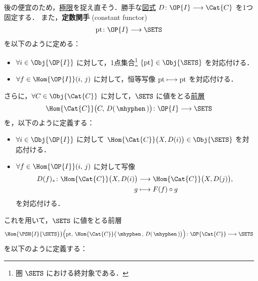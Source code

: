\documentclass[TQFT_main]{subfiles}
\begin{document}
後の便宜のため，\hyperref[def:lim]{極限}を捉え直そう．勝手な\hyperref[def:diagram]{図式} $D \colon \OP{I} \lto \Cat{C}$ を1つ固定する．
また，\textbf{定数関手} (constant functor) 
\begin{align}
    \label{eq:constant-functor}
    \mathrm{pt} \colon \OP{I} \lto \SETS
\end{align}
を以下のように定める：
\begin{itemize}
    \item $\forall i \in \Obj{\OP{I}}$ に対して，1点集合\footnote{圏 $\SETS$ における終対象である．} $\{\mathrm{pt}\} \in \Obj{\SETS}$ を対応付ける．
    \item $\forall f \in \Hom{\OP{I}}(i,\, j)$ に対して，恒等写像 $\mathrm{pt} \longmapsto \mathrm{pt}$ を対応付ける．
\end{itemize}
さらに，$\forall C \in \Obj{\Cat{C}}$ に対して，$\SETS$ に値をとる\hyperref[def:presheaf-general]{前層}
\begin{align}
    \Hom{\Cat{C}}\bigl( C,\, D(\, \mhyphen \,) \bigr) \colon \OP{I} \lto \SETS
\end{align}
を，以下のように定義する：
\begin{itemize}
    \item $\forall i \in \Obj{\OP{I}}$ に対して $\Hom{\Cat{C}}\bigl(X, D(i)\bigr) \in \Obj{\SETS}$ を対応付ける．
    \item $\forall f \in \Hom{\OP{I}}(i,\, j)$ に対して写像
        \begin{align}
            D(f)_* \colon \Hom{\Cat{C}}\bigl(X, D(i)\bigr) &\lto \Hom{\Cat{C}}\bigl(X, D(j)\bigr), \\
            g &\lmto F(f) \circ g
        \end{align}
    を対応付ける．
\end{itemize}
これを用いて，$\SETS$ に値をとる前層
\begin{align}
    \Hom{\PSH{I}{\SETS}} \Bigl( \mathrm{pt},\, \Hom{\Cat{C}}\bigl(\, \mhyphen \,,\, D(\, \mhyphen \,) \bigr)  \Bigr) \colon \OP{\Cat{C}} \lto \SETS
\end{align}
を以下のように定義する：
\end{document}
